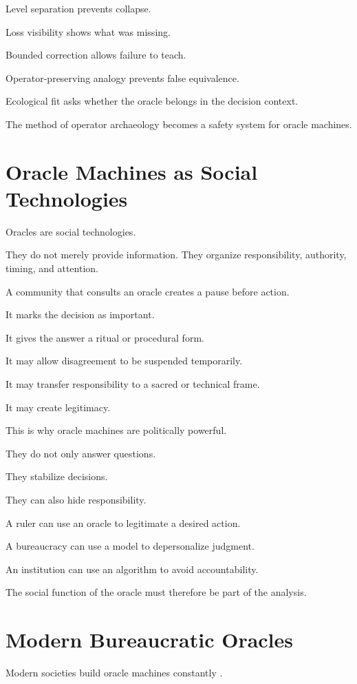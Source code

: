 \documentclass[11pt]{book}
\begin{document}
Level separation prevents collapse.

Loss visibility shows what was missing.

Bounded correction allows failure to teach.

Operator-preserving analogy prevents false equivalence.

Ecological fit asks whether the oracle belongs in the decision context.

The method of operator archaeology becomes a safety system for oracle machines.

\section{Oracle Machines as Social Technologies}

Oracles are social technologies.

They do not merely provide information. They organize responsibility, authority, timing, and attention.

A community that consults an oracle creates a pause before action.

It marks the decision as important.

It gives the answer a ritual or procedural form.

It may allow disagreement to be suspended temporarily.

It may transfer responsibility to a sacred or technical frame.

It may create legitimacy.

This is why oracle machines are politically powerful.

They do not only answer questions.

They stabilize decisions.

They can also hide responsibility.

A ruler can use an oracle to legitimate a desired action.

A bureaucracy can use a model to depersonalize judgment.

An institution can use an algorithm to avoid accountability.

The social function of the oracle must therefore be part of the analysis.

\section{Modern Bureaucratic Oracles}

Modern societies build oracle machines constantly \cite{OConnor2016WeaponsMathDestruction,Eubanks2018AutomatingInequality,Noble2018AlgorithmsOppression}.
\end{document}
